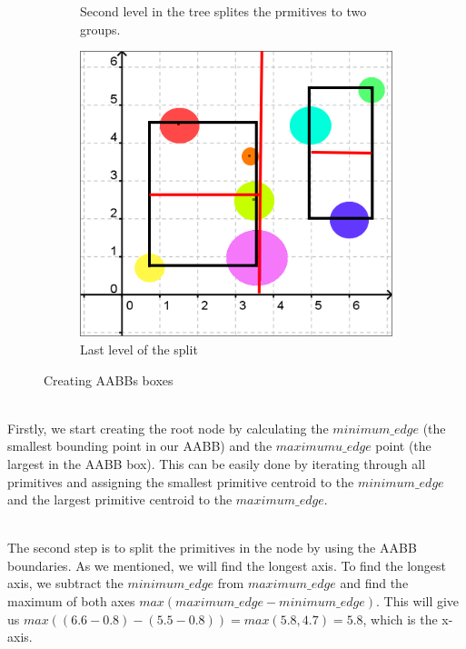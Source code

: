 \documentclass[11pt,a4paper]{article}
\begin{document}
\begin{figure}[h]
\begin{subfigure}[b]{0.3\textwidth}
         \caption{Second level in the tree splites the prmitives to two groups.}
         \label{fig:pi_5000}
     \end{subfigure}
     \hfill
     \begin{subfigure}[b]{0.3\textwidth}
         \centering
         \includegraphics[width=\textwidth]{images/example_bvh/4.png}
         \caption{Last level of the split}
         \label{fig:pi_18000}
     \end{subfigure}
        \caption{Creating AABBs boxes}
        \label{fig:three graphs}
\end{figure}

\noindent
\\
Firstly, we start creating the root node by calculating the $minimum\_edge$ (the smallest bounding point in our AABB) and the $maximumu\_edge$ point (the largest in the AABB box). This can be easily done by iterating through all primitives and assigning the smallest primitive centroid to the  $minimum\_edge$ and the largest primitive centroid to the $maximum\_edge$.

\noindent
\\
The second step is to split the primitives in the node by using the AABB boundaries. As we mentioned, we will find the longest axis.
To find the longest axis, we subtract the $minimum\_edge$ from $maximum\_edge $ and find the maximum of both axes $max(maximum\_edge - minimum\_edge)$. This will give us $max((6.6-0.8) - (5.5-0.8)) = max(5.8,4.7) = 5.8$, which is the x-axis. 
\end{document}
